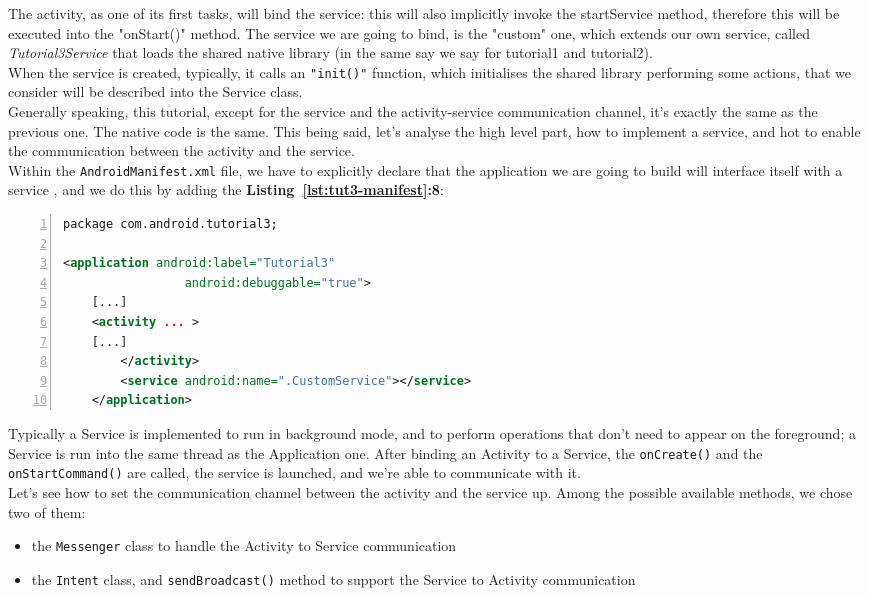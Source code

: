 \documentclass[a4paper,10pt]{article}
\newcommand{\keyword}[1]{\texttt{#1}}
\newcommand{\refl}[1]{\textbf{Listing~\ref{#1}}}
\begin{document}
\begin{multicols}{2}
The activity, as one of its first tasks, will bind the service: this will also
implicitly invoke the startService method, therefore this will be executed into
the "onStart()" method. The service we are going to bind, is the "custom" one,
which extends our own service, called \textit{Tutorial3Service} that loads the
shared native library (in the same say we say for tutorial1 and tutorial2).\\
When the service is created, typically, it calls an \texttt{"init()"} function,
which initialises the shared library performing some actions, that we consider
will be described into the Service class.\\
Generally speaking, this tutorial, except for the service and the
activity-service communication channel, it's exactly the same as the previous
one. The native code is the same. This being said, let's analyse
the high level part, how to implement a service, and hot to enable the
communication between the activity and the service.\\
Within the \keyword{AndroidManifest.xml} file, we have to explicitly declare
that the application we are going to build will interface itself with a service
, and we do this by adding the \refl{lst:tut3-manifest}\textbf{:8}:
\begin{lstlisting}[language=xml,
		   columns=fullflexible,
		   showstringspaces=false,
		   xleftmargin=15pt,
		   frame = l,
		   numbers=left,
		   commentstyle=\color{gray}\upshape,
		   caption=AndroidManifest.xml,
		   label=lst:tut3-manifest]
package com.android.tutorial3;

<application android:label="Tutorial3"
                 android:debuggable="true">
	[...]
	<activity ... >
	[...]
        </activity>
        <service android:name=".CustomService"></service> 
    </application>
\end{lstlisting}

Typically a Service is implemented to run in background mode, and to perform
operations that don't need to appear on the foreground; a Service is run into
the same thread as the Application one. After binding an Activity to a Service,
the \keyword{onCreate()} and the \keyword{onStartCommand()} are called, the
service is launched, and we're able to communicate with it.\\
Let's see how to set the communication channel between the activity and the
service up. Among the possible available methods, we chose two of them:

\begin{itemize}
\item the \keyword{Messenger} class to handle the Activity to Service
communication
\item the \keyword{Intent} class, and \keyword{sendBroadcast()} method to
support the Service to Activity communication
\end{itemize}


\end{multicols}
\end{document}
